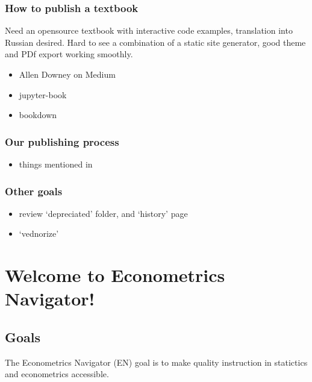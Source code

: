 \documentclass[letterpaper,10pt,english]{sphinxmanual}
\begin{document}
\subsection{How to publish a textbook}
\label{\detokenize{roadmap:how-to-publish-a-textbook}}
Need an opensource textbook with interactive code examples, translation into Russian desired.
Hard to see a combination of a static site generator, good theme and PDf export working smoothly.
\begin{itemize}
\item {} 
Allen Downey on Medium

\item {} 
jupyter-book

\item {} 
bookdown

\end{itemize}


\subsection{Our publishing process}
\label{\detokenize{roadmap:our-publishing-process}}\begin{itemize}
\item {} 
things mentioned in 

\end{itemize}


\subsection{Other goals}
\label{\detokenize{roadmap:other-goals}}\begin{itemize}
\item {} 
review ‘depreciated’ folder, and ‘history’ page

\item {} 
‘vednorize’ 

\end{itemize}


\chapter{Welcome to Econometrics Navigator!}
\label{\detokenize{index:welcome-to-econometrics-navigator}}

\section{Goals}
\label{\detokenize{index:goals}}
The Econometrics Navigator (EN) goal is to make quality instruction in
statictics and econometrics accessible.
\end{document}
